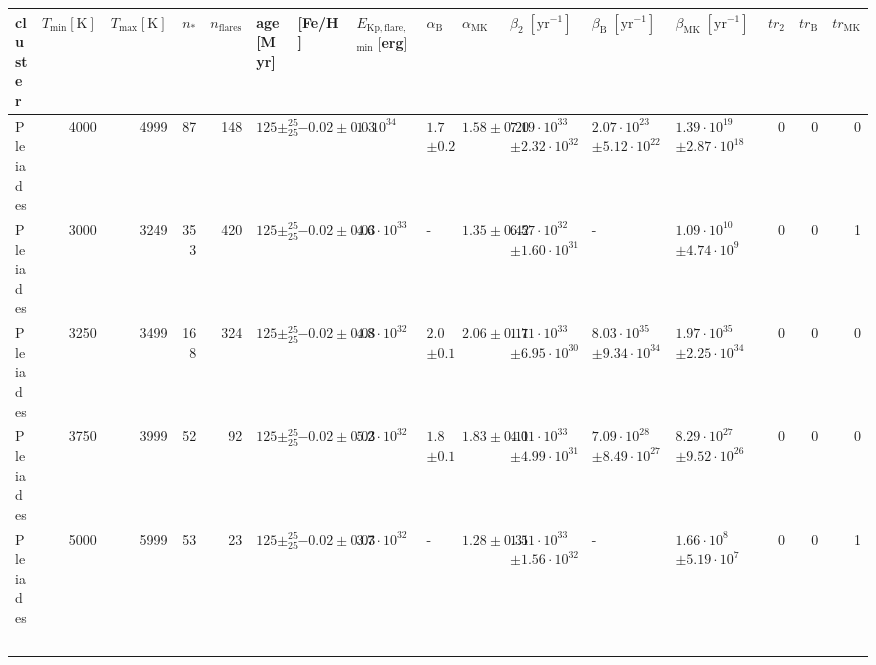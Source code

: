 \begin{tabular}{lrrrrllllllllrrr}
\toprule
  cluster &  $T_\mathrm{min} [\mathrm{K}]$ &  $T_\mathrm{max} [\mathrm{K}]$ &  $n_*$ &  $n_\mathrm{flares}$ &            age [Myr] &          [Fe/H] & $E_\mathrm{Kp,flare,}$$_\mathrm{min}\;[$erg$]$ & $\alpha_\mathrm{B}$ & $\alpha_\mathrm{MK}$ &                  $\beta_2\;[\mathrm{yr}^{-1}]$ &         $\beta_\mathrm{B}\;[\mathrm{yr}^{-1}]$ &        $\beta_\mathrm{MK}\;[\mathrm{yr}^{-1}]$ &  $tr_2$ &  $tr_\mathrm{B}$ &  $tr_\mathrm{MK}$ \\
\midrule
 Pleiades &                           4000 &                           4999 &     87 &                  148 &  $125\pm _{25}^{25}$ &  $-0.02\pm0.03$ &                             $1 \cdot 10^{34}$ &     $1.70$$\pm0.24$ &        $1.58\pm0.20$ &  $7.19 \cdot 10^{33}$$\pm2.32 \cdot 10^{32}$ &  $2.07 \cdot 10^{23}$$\pm5.12 \cdot 10^{22}$ &  $1.39 \cdot 10^{19}$$\pm2.87 \cdot 10^{18}$ &       0 &                0 &                 0 \\
 Pleiades &                           3000 &                           3249 &    353 &                  420 &  $125\pm _{25}^{25}$ &  $-0.02\pm0.03$ &                           $4.6 \cdot 10^{33}$ &                   - &        $1.35\pm0.42$ &  $6.57 \cdot 10^{32}$$\pm1.60 \cdot 10^{31}$ &                                              - &   $1.09 \cdot 10^{10}$$\pm4.74 \cdot 10^{9}$ &       0 &                0 &                 1 \\
 Pleiades &                           3250 &                           3499 &    168 &                  324 &  $125\pm _{25}^{25}$ &  $-0.02\pm0.03$ &                           $4.8 \cdot 10^{32}$ &     $2.08$$\pm0.12$ &        $2.06\pm0.11$ &  $1.71 \cdot 10^{33}$$\pm6.95 \cdot 10^{30}$ &  $8.03 \cdot 10^{35}$$\pm9.34 \cdot 10^{34}$ &  $1.97 \cdot 10^{35}$$\pm2.25 \cdot 10^{34}$ &       0 &                0 &                 0 \\
 Pleiades &                           3750 &                           3999 &     52 &                   92 &  $125\pm _{25}^{25}$ &  $-0.02\pm0.03$ &                           $5.2 \cdot 10^{32}$ &     $1.86$$\pm0.12$ &        $1.83\pm0.11$ &  $4.01 \cdot 10^{33}$$\pm4.99 \cdot 10^{31}$ &  $7.09 \cdot 10^{28}$$\pm8.49 \cdot 10^{27}$ &  $8.29 \cdot 10^{27}$$\pm9.52 \cdot 10^{26}$ &       0 &                0 &                 0 \\
 Pleiades &                           5000 &                           5999 &     53 &                   23 &  $125\pm _{25}^{25}$ &  $-0.02\pm0.03$ &                           $3.7 \cdot 10^{32}$ &                   - &        $1.28\pm0.31$ &  $1.51 \cdot 10^{33}$$\pm1.56 \cdot 10^{32}$ &                                              - &    $1.66 \cdot 10^{8}$$\pm5.19 \cdot 10^{7}$ &       0 &                0 &                 1 \\
$$
\end{tabular}
